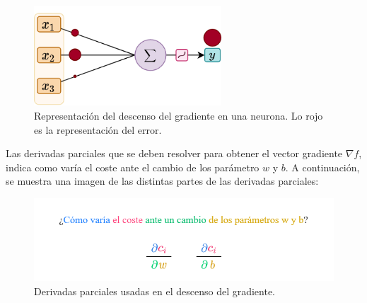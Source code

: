 \begin{itemize}
\begin{figure}[H]
    \centering
    \includegraphics[width=7cm]{images/state-of-art/gradient-descent/gradient_diagram.png}
    \caption{Representación del descenso del gradiente en una neurona. Lo rojo es la representación del error.}
    \label{fig:gradient_descent}
\end{figure}

Las derivadas parciales que se deben resolver para obtener el vector gradiente $\nabla f$, indica como varía el coste ante el cambio de los parámetro $w$ y $b$. A continuación, se muestra una imagen de las distintas partes de las derivadas parciales:

\begin{figure}[H]
    \centering
    \includegraphics[width=13cm]{images/state-of-art/gradient-descent/dx.png}
    \caption{Derivadas parciales usadas en el descenso del gradiente.}
    \label{fig:gradient_descent}
\end{figure}

\end{itemize}


